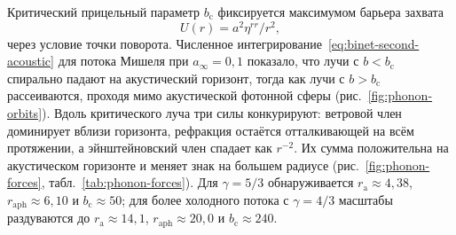 \documentclass[12pt,a4paper,preprint]{elsarticle}
\begin{document}
            Критический прицельный параметр $b_{\mathrm{c}}$ фиксируется максимумом барьера захвата
            \begin{equation}
                U(r) = a^{2}\eta^{rr}/r^{2} ,
                \label{eq:capture-barrier}
            \end{equation}
            через условие точки поворота. Численное интегрирование~\eqref{eq:binet-second-acoustic} для потока Мишеля при $a_{\infty}=0{,}1$ показало, что лучи с $b<b_{\mathrm{c}}$ спирально падают на акустический горизонт, тогда как лучи с $b>b_{\mathrm{c}}$ рассеиваются, проходя мимо акустической фотонной сферы (рис.~\ref{fig:phonon-orbits}). Вдоль критического луча три силы конкурируют: ветровой член доминирует вблизи горизонта, рефракция остаётся отталкивающей на всём протяжении, а эйнштейновский член спадает как $r^{-2}$. Их сумма положительна на акустическом горизонте и меняет знак на большем радиусе (рис.~\ref{fig:phonon-forces}, табл.~\ref{tab:phonon-forces}). Для $\gamma=5/3$ обнаруживается $r_{\mathrm{a}}\approx 4{,}38$, $r_{\mathrm{aph}}\approx 6{,}10$ и $b_{\mathrm{c}}\approx 50$; для более холодного потока с $\gamma=4/3$ масштабы раздуваются до $r_{\mathrm{a}}\approx 14{,}1$, $r_{\mathrm{aph}}\approx 20{,}0$ и $b_{\mathrm{c}}\approx 240$.
\end{document}
